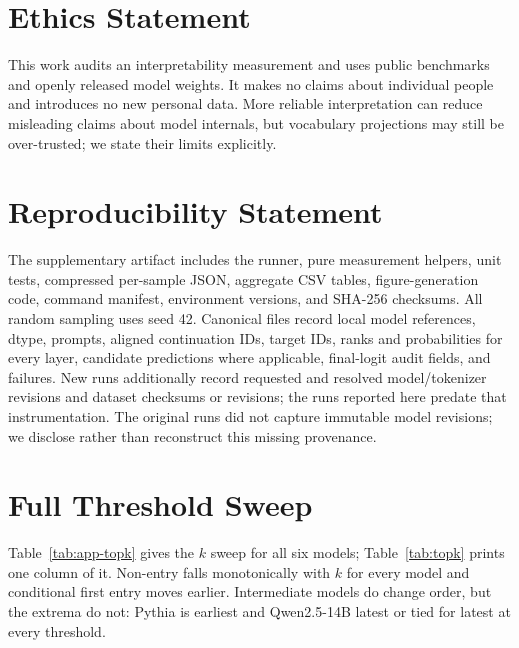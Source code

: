 \documentclass[11pt]{article}
\begin{document}
\section*{Ethics Statement}
This work audits an interpretability measurement and uses public benchmarks and openly released model weights. It makes no claims about individual people and introduces no new personal data. More reliable interpretation can reduce misleading claims about model internals, but vocabulary projections may still be over-trusted; we state their limits explicitly.

\section*{Reproducibility Statement}
The supplementary artifact includes the runner, pure measurement helpers, unit tests, compressed per-sample JSON, aggregate CSV tables, figure-generation code, command manifest, environment versions, and SHA-256 checksums. All random sampling uses seed 42. Canonical files record local model references, dtype, prompts, aligned continuation IDs, target IDs, ranks and probabilities for every layer, candidate predictions where applicable, final-logit audit fields, and failures. New runs additionally record requested and resolved model/tokenizer revisions and dataset checksums or revisions; the runs reported here predate that instrumentation. The original runs did not capture immutable model revisions; we disclose rather than reconstruct this missing provenance.

\begingroup
\small
\setlength{\bibsep}{2pt}

\endgroup

\appendix

\section{Full Threshold Sweep}
\label{app:topk}
Table~\ref{tab:app-topk} gives the $k$ sweep for all six models; Table~\ref{tab:topk} prints one column of it. Non-entry falls monotonically with $k$ for every model and conditional first entry moves earlier. Intermediate models do change order, but the extrema do not: Pythia is earliest and Qwen2.5-14B latest or tied for latest at every threshold.

\begin{table}[t]
\centering

\caption{Threshold sweep on 817 TruthfulQA examples for all six models. Depths are conditional on ever-observed targets.}
\label{tab:app-topk}
\end{table}
\end{document}
